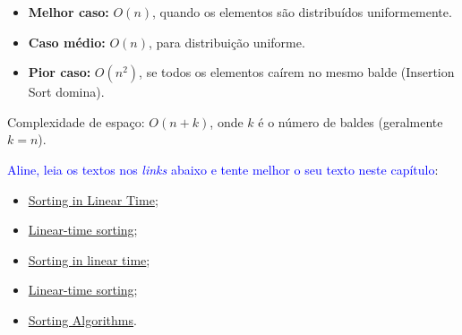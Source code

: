 \begin{itemize}
    \item \textbf{Melhor caso:} $O(n)$, quando os elementos são distribuídos uniformemente.
    \item \textbf{Caso médio:} $O(n)$, para distribuição uniforme.
    \item \textbf{Pior caso:} $O(n^2)$, se todos os elementos caírem no mesmo balde (Insertion Sort domina).
\end{itemize}

Complexidade de espaço: $O(n + k)$, onde $k$ é o número de baldes (geralmente $k=n$).
\vspace{1cm}

\textcolor{blue}{Aline, leia os textos nos \textit{links} abaixo e tente melhor o seu texto neste capítulo}: 
\begin{itemize}
    \item 
\href{https://www.ic.unicamp.br/~ra063658/disciplinas/stco02_2025s1/sort_linear.pdf}{Sorting in Linear Time};

\item \href{https://ocw.mit.edu/courses/6-006-introduction-to-algorithms-fall-2011/bf7d79105762bf79bbc0925438e1468a_MIT6_006F11_lec07.pdf}{Linear-time sorting};

\item  \href{https://iudatastructurescourse.github.io/course-web-page-fall-2024/lectures/sort-linear.html}{Sorting in linear time};

\item \href{http://personal.kent.edu/~amohamm4/daa-f2019/slides/ch4-2%20LinearTime%20Sorting.pdf}{Linear-time sorting};

\item
\href{https://www.dcc.fc.up.pt/~pribeiro/aulas/aed2425/slides/4_sorting.pdf}{Sorting Algorithms}.
\end{itemize}
